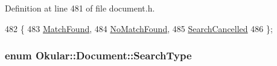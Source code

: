 Definition at line 481 of file document.\+h.


\begin{DoxyCode}
482         \{
483             \hyperlink{classOkular_1_1Document_aa9c2934f6abce7b0440ec74bb56eefbbaee768cc03e09b4188b091b652e1556ab}{MatchFound},        
484             \hyperlink{classOkular_1_1Document_aa9c2934f6abce7b0440ec74bb56eefbba6f1e44c2a23dde543d40770f949a2882}{NoMatchFound},      
485             \hyperlink{classOkular_1_1Document_aa9c2934f6abce7b0440ec74bb56eefbbacc76ba5b7c23f4d24515076e946373b4}{SearchCancelled}    
486         \};
\end{DoxyCode}
\hypertarget{classOkular_1_1Document_af4b4b32563d6013d6da10be1667a7bad}{
\subsubsection[{Search\+Type}]{\setlength{\rightskip}{0pt plus 5cm}enum {\bf Okular\+::\+Document\+::\+Search\+Type}}}\label{classOkular_1_1Document_af4b4b32563d6013d6da10be1667a7bad}
